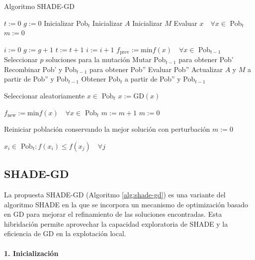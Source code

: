 \begin{algorithm}
\caption{Algoritmo SHADE-GD}
\label{alg:shade-gd}
	\begin{algorithmic}
		\State $t := 0$
		\State $g:= 0$
		\State Inicializar Pob$_t$
		\State Inicializar $A$ 
		\State Inicializar $M$ 
		\State Evaluar $x \quad \forall x \in$ Pob$_t$
		\State $m := 0$ 
		
			\State $i := 0$ 
			\State $g:= g+1$
				\State $t := t + 1$
				\State $i := i+1$
				\State $f_{\text{prev}} := \text{min} f(x) \quad \forall x \in$ Pob$_{t-1}$
				\State Seleccionar $p$ soluciones para la mutación
				\State Mutar Pob$_{t-1}$ para obtener Pob'
				\State Recombinar Pob' y Pob$_{t-1}$ para obtener Pob''
				\State Evaluar Pob''
				\State Actualizar $A$ y $M$ a partir de Pob'' y Pob$_{t-1}$
				\State Obtener Pob$_t$ a partir de Pob'' y Pob$_{t-1}$
			\EndWhile
			
				\State Seleccionar aleatoriamente $x \in$ Pob$_t$
				\State $x := \text{GD}(x)$
			\EndIf
			
			\State $f_{\text{new}} := \text{min} f(x) \quad \forall x \in$ Pob$_t$
				\State $m := m + 1$
			\Else
				\State $m := 0$
			\EndIf
			
				\State Reiniciar población conservando la mejor solución con perturbación
				\State $m := 0$
			\EndIf
		\EndWhile
		
		\Return $x_i \in$ Pob$_t : f(x_i) \leq f(x_j) \quad \forall j$
	\end{algorithmic}
\end{algorithm}



\subsection{SHADE-GD}

La propuesta SHADE-GD (Algoritmo \ref{alg:shade-gd}) es una variante del algoritmo SHADE en la que se incorpora un mecanismo de optimización basado en GD para mejorar el refinamiento de las soluciones encontradas. Esta hibridación permite aprovechar la capacidad exploratoria de SHADE y la eficiencia de GD en la explotación local.

\paragraph{1. Inicialización\\}

